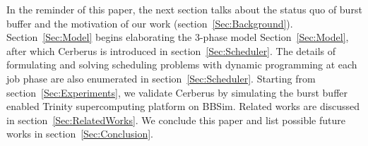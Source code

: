 In the reminder of this paper,
the next section talks about the status quo of burst buffer and
the motivation of our work (section~\ref{Sec:Background}).
Section~\ref{Sec:Model} begins elaborating the 3-phase model Section~\ref{Sec:Model},
after which Cerberus is introduced in section~\ref{Sec:Scheduler}.
The details of formulating and solving scheduling problems with
dynamic programming at each job phase are also
enumerated in section~\ref{Sec:Scheduler}.
Starting from section~\ref{Sec:Experiments}, we validate Cerberus
by simulating the burst buffer enabled Trinity supercomputing platform on BBSim.
Related works are discussed in section~\ref{Sec:RelatedWorks}.
We conclude this paper and list possible future works in section~\ref{Sec:Conclusion}.

